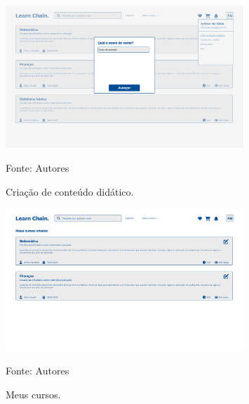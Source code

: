 \begin{apendicesenv}
    \begin{figure}[h]
        \centering
        \caption{Criação de conteúdo didático.}
        \includegraphics[width=0.8\textwidth]{figuras/Criar_conteudo_didatico.png}
        \begin{center}
            {\footnotesize Fonte: Autores}
        \end{center}
        \label{fig:Criar_conteudo_didatico}
    \end{figure}

    \begin{figure}[h]
        \centering
        \caption{Meus cursos.}
        \includegraphics[width=0.8\textwidth]{figuras/meus_cursos.png}
        \begin{center}
            {\footnotesize Fonte: Autores}
        \end{center}
        \label{fig:meus_cursos}
    \end{figure}


\end{apendicesenv}
